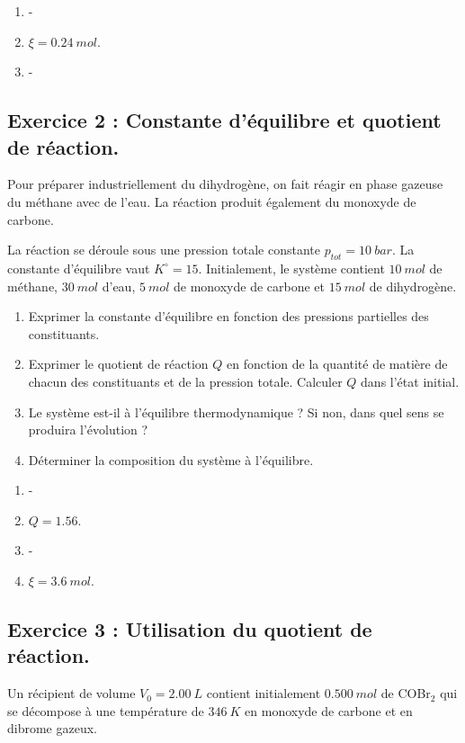 \begin{enumerate}
	\item -
	\item $\xi = \SI{0.24}{mol}$.
	\item - 
\end{enumerate}

\subsection{Exercice 2 : Constante d'équilibre et quotient de réaction.}

Pour préparer industriellement du dihydrogène, on fait réagir en phase gazeuse du méthane avec de l'eau. La réaction produit également du monoxyde de carbone.

La réaction se déroule sous une pression totale constante $p_{tot} = \SI{10}{bar}$. La constante d'équilibre vaut $K^\circ = 15$. Initialement, le système contient $\SI{10}{mol}$ de méthane, $\SI{30}{mol}$ d'eau, $\SI{5}{mol}$ de monoxyde de carbone et $\SI{15}{mol}$ de dihydrogène. 

\begin{enumerate}
	\item Exprimer la constante d'équilibre en fonction des pressions partielles des constituants.
	\item Exprimer le quotient de réaction $Q$ en fonction de la quantité de matière de chacun des constituants et de la pression totale. Calculer $Q$ dans l'état initial.
	\item Le système est-il à l'équilibre thermodynamique ? Si non, dans quel sens se produira l'évolution ?
	\item Déterminer la composition du système à l'équilibre.
\end{enumerate}

\begin{enumerate}
	\item -
	\item $Q = 1.56$.
	\item -
	\item $\xi = \SI{3.6}{mol}$.
\end{enumerate}

\subsection{Exercice 3 : Utilisation du quotient de réaction.}

Un récipient de volume $V_0 = \SI{2.00}{L}$ contient initialement $\SI{0.500}{mol}$ de COBr$_2$ qui se décompose à une température de $\SI{346}{K}$ en monoxyde de carbone et en dibrome gazeux.


